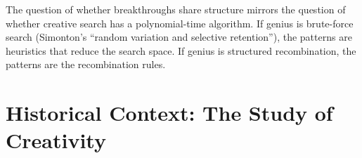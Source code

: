 \begin{connectionbox}
The question of whether breakthroughs share structure mirrors the question of whether creative search has a polynomial-time algorithm. If genius is brute-force search (Simonton's ``random variation and selective retention''), the patterns are heuristics that reduce the search space. If genius is structured recombination, the patterns are the recombination rules.

\end{connectionbox}

\section{Historical Context: The Study of Creativity}
\label{sec:anatomy:context}

